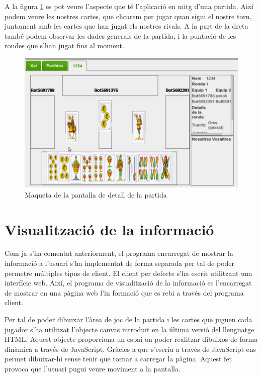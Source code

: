A la figura \ref{fig:real-partida} es pot veure l'aspecte que té l'aplicació en mitg d'una partida. Així podem veure les nostres cartes, que clicarem per jugar quan sigui el nostre torn, juntament amb les cartes que han jugat els nostres rivals. A la part de la dreta també podem observar les dades generals de la partida, i la puntació de les rondes que s'han jugat fins al moment. 
\begin{figure}[htbp]
\centering\includegraphics{img/real-partida.png}
\caption{Maqueta de la pantalla de detall de la partida}
\label{fig:real-partida}
\end{figure} 


\section{Visualització de la informació}
\label{sec:visualitzacio-informacio}

Com ja s'ha comentat anteriorment, el programa encarregat de mostrar la informació a l'usuari s'ha implementat de forma separada per tal de poder permetre múltiples tipus de client. El client per defecte s'ha escrit utilitzant una interfície web. Així, el programa de visualització de la informació es l'encarregat de mostrar en una pàgina web l'in formació que es rebi a través del programa client.

Per tal de poder dibuixar l'àrea de joc de la partida i les cartes que juguen cada jugador s'ha utilitzat l'objecte canvas introduït en la última versió del llenguatge HTML. Aquest objecte proporciona un espai on poder realitzar dibuixos de forma dinàmica a través de JavaScript. Gràcies a que s'escriu a través de JavaScript ens permet dibuixar-hi sense tenir que tornar a carregar la pàgina. Aquest fet provoca que l'usuari pugui veure moviment a la pantalla. 

